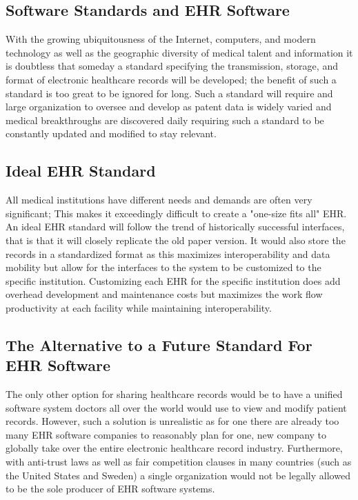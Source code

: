 \documentclass[14pt]{article}
\begin{document}
\subsection{Software Standards and EHR Software}
With the growing ubiquitousness of the Internet, computers, and modern technology as well as the geographic diversity of medical talent and information it is doubtless that someday a standard specifying the transmission, storage, and format of electronic healthcare records will be developed; the benefit of such a standard is too great to be ignored for long. Such a standard will require and large organization to oversee and develop as patent data is widely varied and medical breakthroughs are discovered daily requiring such a standard to be constantly updated and modified to stay relevant. 

\subsection{Ideal EHR Standard}
All medical institutions have different needs and demands  are often very significant; This makes it exceedingly difficult to create a "one-size fits all" \gls{EHR}. An ideal \gls{EHR} standard will follow the trend of historically successful interfaces, that is that it will closely replicate the old paper version. It would also store the records in a standardized format as this maximizes interoperability and data mobility but allow for the interfaces to the system to be customized to the specific institution. Customizing each \gls{EHR} for the specific institution does add overhead development and maintenance costs but maximizes the work flow productivity at each facility while maintaining interoperability. 

\subsection{The Alternative to a Future Standard For EHR Software}
The only other option for sharing healthcare records would be to have a unified software system doctors all over the world would use to view and modify patient records. However, such a solution is unrealistic as for one there are already too many \gls{EHR} software companies to reasonably plan for one, new company to globally take over the entire electronic healthcare record industry. Furthermore, with anti-trust laws as well as fair competition clauses in many countries (such as the United States and Sweden) a single organization would not be legally allowed to be the sole producer of \gls{EHR} software systems.
\end{document}
